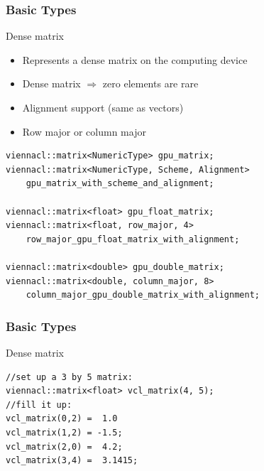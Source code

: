 \begin{frame}[fragile]
\frametitle{Basic Types}

\begin{block}{Dense matrix}  
  \begin{itemize}
   \item Represents a dense matrix on the computing device
   \item Dense matrix $\Rightarrow$ zero elements are rare
   \item Alignment support (same as vectors)
   \item Row major or column major
  \end{itemize}
  
  \begin{lstlisting}
viennacl::matrix<NumericType> gpu_matrix;
viennacl::matrix<NumericType, Scheme, Alignment>
    gpu_matrix_with_scheme_and_alignment;

viennacl::matrix<float> gpu_float_matrix;
viennacl::matrix<float, row_major, 4>
    row_major_gpu_float_matrix_with_alignment;

viennacl::matrix<double> gpu_double_matrix;
viennacl::matrix<double, column_major, 8>
    column_major_gpu_double_matrix_with_alignment;
  \end{lstlisting}
\end{block}

\end{frame}




\begin{frame}[fragile]
\frametitle{Basic Types}

\begin{block}{Dense matrix}
  \begin{lstlisting}
//set up a 3 by 5 matrix:
viennacl::matrix<float> vcl_matrix(4, 5);
//fill it up:
vcl_matrix(0,2) =  1.0
vcl_matrix(1,2) = -1.5;
vcl_matrix(2,0) =  4.2;
vcl_matrix(3,4) =  3.1415;
  \end{lstlisting}
\end{block}

\end{frame}




